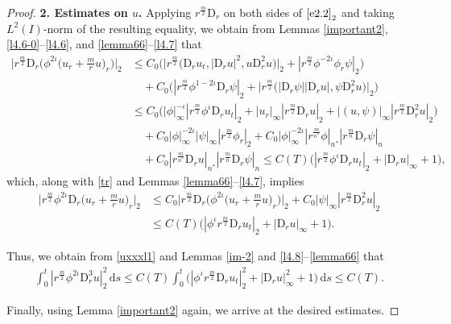 \documentclass[11pt,reqno]{amsart}
\numberwithin{rk}{section}
\numberwithin{prop}{section}
\numberwithin{mydef}{section}
\numberwithin{lem}{section}
\numberwithin{equation}{section}
\numberwithin{thm}{section}
\begin{document}
\begin{proof}
\smallskip
\textbf{2. Estimates on $u$.} Applying $r^\frac{m}{2}\mathrm{D}_r$ on both sides of $\eqref{e2.2}_2$ and taking $L^2(I)$-norm of the resulting equality,
we obtain from Lemmas \ref{important2}, \ref{l4.6-0}--\ref{l4.6}, 
and \ref{lemma66}--\ref{l4.7} that
\begin{equation*} 
\begin{aligned}
\Big|r^{\frac{m}{2}}\mathrm{D}_r\big(\phi^{2\iota}\big(u_r+ \frac{m}{r}u\big)_{r}\big)\Big|_2&\leq C_0\big(\big|r^{\frac{m}{2}}\big(\mathrm{D}_ru_{t},|\mathrm{D}_ru|^2,u\mathrm{D}_r^2u\big)\big|_2+ |r^{\frac{m}{2}}\phi^{-2\iota}\phi_r\psi|_2\big)\\
&\quad +C_0\big(|r^{\frac{m}{2}}\phi^{1-2\iota}\mathrm{D}_r\psi|_2+\big|r^\frac{m}{2}\big(|\mathrm{D}_r\psi||\mathrm{D}_ru|,\psi \mathrm{D}_r^2u \big)\big|_2\big)\\
&\leq C_0\big(|\phi|_\infty^{-\iota}|r^{\frac{m}{2}}\phi^\iota \mathrm{D}_r u_t|_{2}+|u_r|_\infty|r^{\frac{m}{2}}\mathrm{D}_ru|_2+ |(u,\psi)|_\infty|r^{\frac{m}{2}}\mathrm{D}_r^2 u|_2\big)\\
&\quad +C_0 |\phi|_\infty^{-2\iota}|\psi|_\infty|r^{\frac{m}{2}}\phi_r|_2
+C_0|\phi|_\infty^{-2\iota}|r^\frac{m}{n^*}\phi|_{n^*}|r^{\frac{m}{n}}\mathrm{D}_r\psi|_n\\
&\quad +C_0|r^\frac{m}{n^*}\mathrm{D}_r u|_{n^*} |r^{\frac{m}{n}}\mathrm{D}_r\psi|_n \leq C(T)\big(|r^{\frac{m}{2}}\phi^\iota \mathrm{D}_ru_t|_{2}+|\mathrm{D}_r u|_\infty+1\big),
\end{aligned}    
\end{equation*}
which, along with \eqref{tr} and Lemmas \ref{lemma66}--\ref{l4.7}, implies
\begin{equation}\label{uxxxl1}
\begin{aligned}
\Big|r^{\frac{m}{2}} \phi^{2\iota}\mathrm{D}_r\big(u_r+ \frac{m}{r}u\big)_{r}\Big|_2&\leq C_0\Big|r^{\frac{m}{2}}\mathrm{D}_r\Big(\phi^{2\iota}\big(u_r+ \frac{m}{r}u\big)_{r}\Big)\Big|_2+C_0|\psi|_\infty  |r^{\frac{m}{2}}\mathrm{D}_r^2 u|_2\\
&\leq C(T)\big(|\phi^\iota r^{\frac{m}{2}}\mathrm{D}_r u_t|_{2}+|\mathrm{D}_r u|_\infty+1\big).
\end{aligned}
\end{equation}

Thus, we obtain from \eqref{uxxxl1}  and Lemmas \ref{im-2} and \ref{l4.8}--\ref{lemma66} that
\begin{equation}
\begin{aligned}
\int_0^t|r^\frac{m}{2}\phi^{2\iota}\mathrm{D}_r^3 u|_2^2\,\mathrm{d}s \leq C(T)\int_0^t\big(|\phi^\iota r^{\frac{m}{2}}\mathrm{D}_r u_t|_{2}^2+|\mathrm{D}_r u|_\infty^2+1\big)\,\mathrm{d}s \leq C(T).
\end{aligned}
\end{equation}

Finally, using Lemma \ref{important2} again, we arrive at the desired estimates. 
\end{proof}
\end{document}
